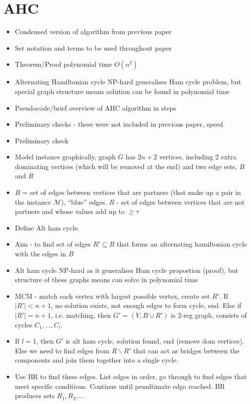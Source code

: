\documentclass{elsarticle}
\begin{document}
\section{AHC}
\begin{itemize}
	\item Condensed version of algorithm from previous paper
	\item Set notation and terms to be used throughout paper
	\item Theorem/Proof polynomial time $O(n^2)$
	\item Alternating Hamiltonian cycle NP-hard generalises Ham cycle problem, but special graph structure means solution can be found in polynomial time
	\item Pseudocode/brief overview of AHC algorithm in steps
	\item Preliminary checks - these were not included in previous paper, speed
	\item Preliminary check
	\item Model instance graphically, graph $G$ has $2n+2$ vertices, including 2 extra dominating vertices (which will be removed at the end) and two edge sets, $B$ and $R$
	\item $B$ = set of edges between vertices that are partners (that make up a pair in the instance $\mathcal{M}$), ``blue'' edges. $R$ - set of edges between vertices that are not partners and whose values add up to $\geq \tau$
	\item Define Alt ham cycle.
	\item Aim - to find set of edges $R' \subseteq R$ that forms an alternating hamiltonian cycle with the edges in $B$
	\item Alt ham cycle NP-hard as it generalises Ham cycle propostion (proof), but structure of these graphs means can solve in polynomial time
	\item MCM - match each vertex with largest possible vertex, create set $R'$. If $|R'| < n+1$, no solution exists, not enough edges to form cycle, end. Else if $|R'| = n+1$, i.e. matching, then $G' = (V, B \cup R')$ is 2-reg graph, consists of cycles $C_1,...,C_l$.
	\item If $l = 1$, then $G'$ is alt ham cycle, solution found, end (remove dom vertices). Else we need to find edges from $R\backslash R'$ that can act as bridges between the components and join them together into a single cycle. 
	\item Use BR to find these edges. List edges in order, go through to find edges that meet specific conditions. Continue until penultimate edge reached. BR produces sets $R_1, R_2,...$

\end{itemize}
\end{document}
